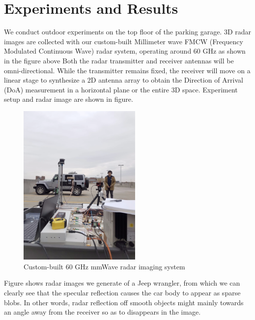 \section{ Experiments and Results} \label{experiment}
We conduct outdoor experiments on the top floor of the parking garage. 3D radar images are collected with our custom-built Millimeter wave FMCW (Frequency Modulated Continuous Wave) radar system, operating around 60 GHz as shown in the figure above Both the radar transmitter and receiver antennas will be omni-directional. While the transmitter remains fixed, the receiver will move on a linear stage to synthesize a 2D antenna array to obtain the Direction of Arrival (DoA) measurement in a horizontal plane or the entire 3D space. Experiment setup and radar image are shown in figure.

\begin{figure}
	\centering
	\includegraphics[width=6cm,height=8cm]{./figure/exp_2.png}
	\caption{Custom-built 60 GHz mmWave radar imaging system}
\end{figure}

 Figure shows radar images we generate of a Jeep wrangler, from which we can clearly see that the specular reflection causes the car body to appear as sparse blobs. In other words, radar reflection off smooth objects might mainly towards an angle away from the receiver so as to disappears in the image.
 
